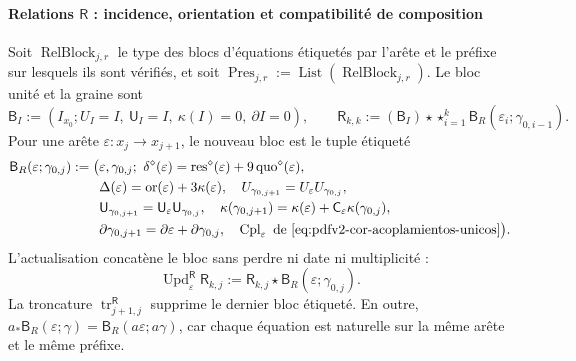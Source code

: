\paragraph{Relations \(\mathsf R\) : incidence, orientation et compatibilité de composition}
Soit \(\operatorname{RelBlock}_{j,r}\) le type des blocs d'équations étiquetés par l'arête et le préfixe sur lesquels ils sont vérifiés, et soit \(\operatorname{Pres}_{j,r}:=\operatorname{List}
(\operatorname{RelBlock}_{j,r})\). Le bloc unité et la graine sont
\begin{equation}
\label{eq:pdfv2-terminal-semilla-r}
 \mathsf B_I:=(I_{x_0};U_I=I,\ \mathsf U_I=I,\ \kappa(I)=0,\ \partial I=0),
 \qquad
 \mathsf R_{k,k}:=(\mathsf B_I)\star
 \mathop{\star}_{i=1}^{k}
 \mathsf B_R(\varepsilon_i;\gamma_{0,i-1}).
\end{equation}
Pour une arête \(\varepsilon:x_j\to x_{j+1}\), le nouveau bloc est le tuple étiqueté
\begin{equation}
\label{eq:pdfv2-terminal-bloque-r}
 \begin{split}
 \mathsf B_R(\varepsilon;\gamma_{0,j}):=\bigl(
 &\varepsilon,\gamma_{0,j};\ 
 \delta^\diamond(\varepsilon)
 =\operatorname{res}^\diamond(\varepsilon)
  +9\operatorname{quo}^\diamond(\varepsilon),\\
 &\Delta(\varepsilon)=\operatorname{or}(\varepsilon)
  +3\kappa(\varepsilon),\quad
 U_{\gamma_{0,j+1}}=U_\varepsilon U_{\gamma_{0,j}},\\
 &\mathsf U_{\gamma_{0,j+1}}
 =\mathsf U_\varepsilon\mathsf U_{\gamma_{0,j}},\quad
 \kappa(\gamma_{0,j+1})
 =\kappa(\varepsilon)+\mathsf C_\varepsilon\kappa(\gamma_{0,j}),\\
 &\partial\gamma_{0,j+1}
 =\partial\varepsilon+\partial\gamma_{0,j},\quad
 \operatorname{Cpl}_\varepsilon
 \text{ de }\eqref{eq:pdfv2-cor-acoplamientos-unicos}
 \bigr).
 \end{split}
\end{equation}
L'actualisation concatène le bloc sans perdre ni date ni multiplicité :
\begin{equation}
\label{eq:pdfv2-terminal-update-r}
 \operatorname{Upd}^{\mathsf R}_{\varepsilon}\mathsf R_{k,j}
 :=\mathsf R_{k,j}\star\mathsf B_R(\varepsilon;\gamma_{0,j}).
\end{equation}
La troncature \(\operatorname{tr}^{\mathsf R}_{j+1,j}\) supprime le dernier bloc étiqueté. En outre, \(a_*\mathsf B_R(\varepsilon;\gamma)
=\mathsf B_R(a\varepsilon;a\gamma)\), car chaque équation est naturelle sur la même arête et le même préfixe.

